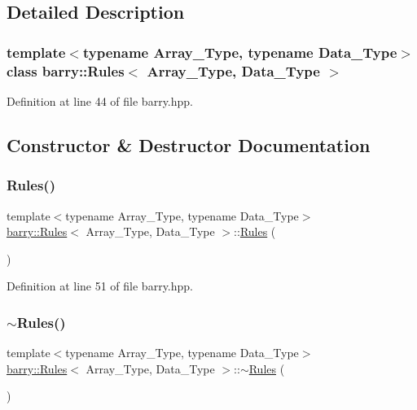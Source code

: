 \subsection{Detailed Description}
\subsubsection*{template$<$typename Array\+\_\+\+Type, typename Data\+\_\+\+Type$>$\newline
class barry\+::\+Rules$<$ Array\+\_\+\+Type, Data\+\_\+\+Type $>$}



Definition at line 44 of file barry.\+hpp.



\subsection{Constructor \& Destructor Documentation}
\mbox{\label{classbarry_1_1_rules_ac9468cdfab55a3be6675ad1fddae2bc0}} 
\subsubsection{\texorpdfstring{Rules()}{Rules()}}
{\footnotesize\ttfamily template$<$typename Array\+\_\+\+Type, typename Data\+\_\+\+Type$>$ \\
\hyperlink{classbarry_1_1_rules}{barry\+::\+Rules}$<$ Array\+\_\+\+Type, Data\+\_\+\+Type $>$\+::\hyperlink{classbarry_1_1_rules}{Rules} (\begin{DoxyParamCaption}{ }\end{DoxyParamCaption})\hspace{0.3cm}{\ttfamily [inline]}}



Definition at line 51 of file barry.\+hpp.

\mbox{\label{classbarry_1_1_rules_a287ba2cf76f83ad982c05383b5726946}} 
\subsubsection{\texorpdfstring{$\sim$\+Rules()}{~Rules()}}
{\footnotesize\ttfamily template$<$typename Array\+\_\+\+Type, typename Data\+\_\+\+Type$>$ \\
\hyperlink{classbarry_1_1_rules}{barry\+::\+Rules}$<$ Array\+\_\+\+Type, Data\+\_\+\+Type $>$\+::$\sim$\hyperlink{classbarry_1_1_rules}{Rules} (\begin{DoxyParamCaption}{ }\end{DoxyParamCaption})\hspace{0.3cm}{\ttfamily [inline]}}



